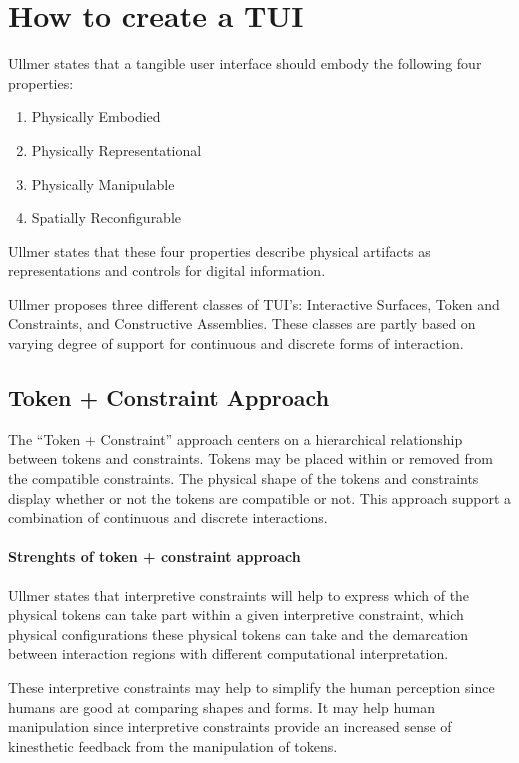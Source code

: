 \section{How to create a TUI}
Ullmer states that a tangible user interface should embody the following four properties\cite{ullmer2002tangible}:

\begin{enumerate}
	\item{Physically Embodied}
	\item{Physically Representational}
	\item{Physically Manipulable}
	\item{Spatially Reconfigurable}
\end{enumerate}

Ullmer states that these four properties describe physical artifacts as representations and controls for digital information. 

Ullmer proposes three different classes of TUI's: Interactive Surfaces, Token and Constraints, and Constructive Assemblies. These classes are partly based on varying degree of support for continuous and discrete forms of interaction\cite{ullmer2002tangible}.

\subsection{Token + Constraint Approach}
The ``Token + Constraint'' approach centers on a hierarchical relationship between tokens and constraints. Tokens may be placed within or removed from the compatible constraints. The physical shape of the tokens and constraints display whether or not the tokens are compatible or not. This approach support a combination of continuous and discrete interactions. 

\paragraph{Strenghts of token + constraint approach}
Ullmer states that interpretive constraints will help to express which of the physical tokens can take part within a given interpretive constraint, which physical configurations these physical tokens can take and the demarcation between interaction regions with different computational interpretation.

These interpretive constraints may help to simplify the human perception since humans are good at comparing shapes and forms. 
It may help human manipulation since interpretive constraints provide an increased sense of kinesthetic feedback from the manipulation of tokens. 




